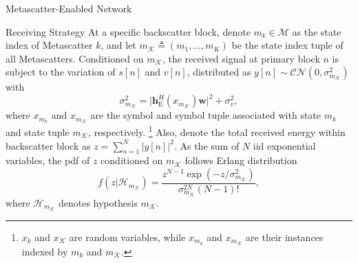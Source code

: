 \documentclass[journal]{IEEEtran}
\begin{document}
\begin{section}{Metascatter-Enabled Network}
\begin{subsection}{Receiving Strategy}
		At a specific backscatter block, denote $m_k \in \mathcal{M}$ as the state index of Metascatter $k$, and let $m_{\mathcal{K}} \triangleq (m_1,\ldots,m_K)$ be the state index tuple of all Metascatters.
		Conditioned on $m_{\mathcal{K}}$, the received signal at primary block $n$ is subject to the variation of $s[n]$ and $v[n]$, distributed as $y[n] \sim \mathcal{CN}(0,\sigma_{m_{\mathcal{K}}}^2)$ with
		\begin{equation}
			\sigma_{m_{\mathcal{K}}}^2 = \lvert \boldsymbol{h}_{\mathrm{E}}^H(x_{m_{\mathcal{K}}}) \boldsymbol{w} \rvert^2 + \sigma_v^2,
			\label{eq:receive_variance}
		\end{equation}
		where $x_{m_k}$ and $x_{m_\mathcal{K}}$ are the symbol and symbol tuple associated with state $m_k$ and state tuple $m_{\mathcal{K}}$, respectively.%
		\footnote{
			$x_k$ and $x_{\mathcal{K}}$ are random variables, while $x_{m_k}$ and $x_{m_{\mathcal{K}}}$ are their instances indexed by $m_k$ and $m_{\mathcal{K}}$.
		}
		Also, denote the total received energy within backscatter block as $z=\sum_{n=1}^N \lvert y[n] \rvert^2$.
		As the sum of $N$ \gls{iid} exponential variables, the \gls{pdf} of $z$ conditioned on $m_{\mathcal{K}}$ follows Erlang distribution
		\begin{equation}
			f(z|\mathcal{H}_{m_{\mathcal{K}}}) = \frac{z^{N-1} \exp(-z/\sigma_{m_{\mathcal{K}}}^2)}{\sigma_{m_{\mathcal{K}}}^{2N} (N-1)!},
			\label{eq:energy_distribution}
		\end{equation}
		where $\mathcal{H}_{m_{\mathcal{K}}}$ denotes hypothesis $m_{\mathcal{K}}$.

\end{subsection}
\end{section}
\end{document}
